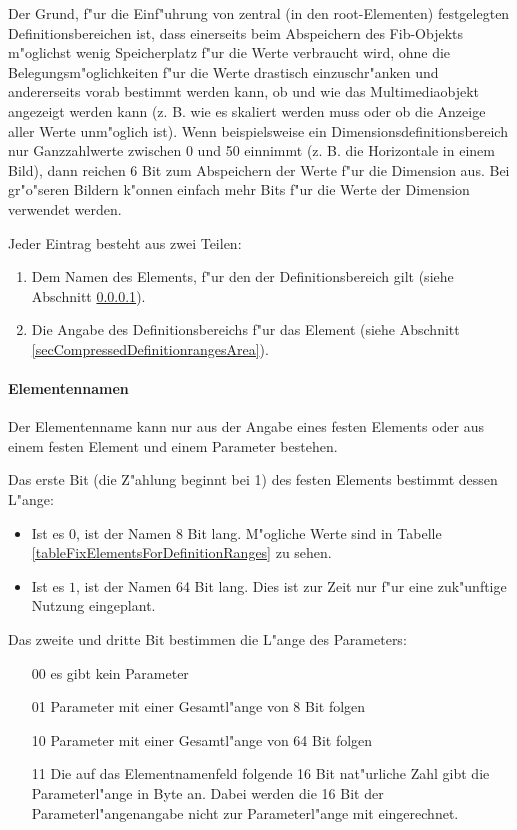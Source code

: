 Der Grund, f"ur die Einf"uhrung von zentral (in den root-Elementen) festgelegten Definitionsbereichen ist, dass einerseits beim Abspeichern des Fib-Objekts m"oglichst wenig Speicherplatz f"ur die Werte verbraucht wird, ohne die Belegungsm"oglichkeiten f"ur die Werte drastisch einzuschr"anken und andererseits vorab bestimmt werden kann, ob und wie das Multimediaobjekt angezeigt werden kann (z. B. wie es skaliert werden muss oder ob die Anzeige aller Werte unm"oglich ist). Wenn beispielsweise ein Dimensionsdefinitionsbereich nur Ganzzahlwerte zwischen 0 und 50 einnimmt (z. B. die Horizontale in einem Bild), dann reichen 6 Bit zum Abspeichern der Werte f"ur die Dimension aus. Bei gr"o"seren Bildern k"onnen einfach mehr Bits f"ur die Werte der Dimension verwendet werden.

\bigskip\noindent
Jeder Eintrag besteht aus zwei Teilen:
\begin{enumerate}
 \item Dem Namen des Elements, f"ur den der Definitionsbereich gilt (siehe Abschnitt \ref{secCompressedDefinitionrangesElements}).
 \item Die Angabe des Definitionsbereichs f"ur das Element (siehe Abschnitt \ref{secCompressedDefinitionrangesArea}).
\end{enumerate}


\paragraph{Elementennamen}
\label{secCompressedDefinitionrangesElements}

Der Elementenname kann nur aus der Angabe eines festen Elements oder aus einem festen Element und einem Parameter bestehen.

\bigskip\noindent
Das erste Bit (die Z"ahlung beginnt bei 1) des festen Elements bestimmt dessen L"ange:
\begin{itemize}
 \item Ist es $0$, ist der Namen 8 Bit lang. M"ogliche Werte sind in Tabelle \ref{tableFixElementsForDefinitionRanges} zu sehen.
 \item Ist es $1$, ist der Namen 64 Bit lang. Dies ist zur Zeit nur f"ur eine zuk"unftige Nutzung eingeplant.
\end{itemize}

\bigskip\noindent
Das zweite und dritte Bit bestimmen die L"ange des Parameters:
\begin{itemize}
 \item[00] es gibt kein Parameter
 \item[01] Parameter mit einer Gesamtl"ange von 8 Bit folgen
 \item[10] Parameter mit einer Gesamtl"ange von 64 Bit folgen
 \item[11] Die auf das Elementnamenfeld folgende 16 Bit nat"urliche Zahl gibt die Parameterl"ange in Byte an. Dabei werden die 16 Bit der Parameterl"angenangabe nicht zur Parameterl"ange mit eingerechnet.
\end{itemize}


